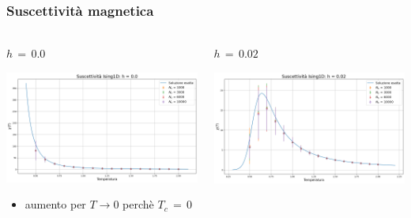 \begin{frame}
    \frametitle{Suscettività magnetica}
    \framesubtitle{}

    \begin{columns}
        \begin{column}{0.5\textwidth}
            \begin{block}{$h\,=\,0.0$}

            \centering
            \includegraphics[width=\textwidth]{Immagini/simIsing1D/chi_h0.0.png}

            \vspace{0.5cm}
            \begin{itemize}[itemsep=0.5em, label=$\diamond$]
                \item aumento per $T \to 0$ perchè $T_c\,=\,0$
            \end{itemize}
            
            \end{block}
        \end{column}
    
        \begin{column}{0.5\textwidth}
            \begin{block}{$h\,=\,0.02$}

                \centering
                \includegraphics[width=\textwidth]{Immagini/simIsing1D/chi_h0.02.png}


\end{block}
\end{column}
\end{columns}
\end{frame}
